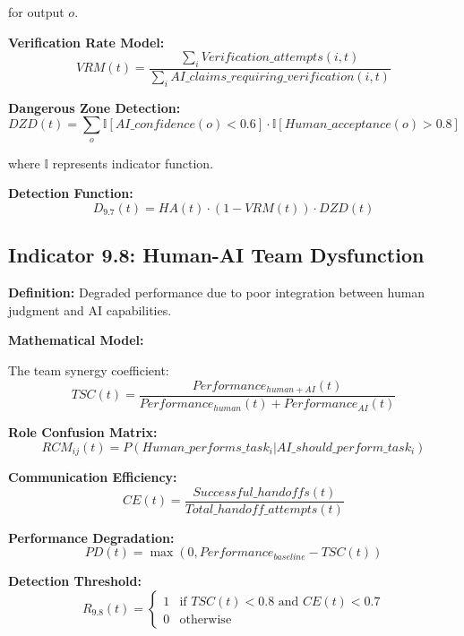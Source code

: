 \documentclass[11pt,a4paper]{article}
\begin{document}
for output $o$.

\textbf{Verification Rate Model:}
\begin{equation}
VRM(t) = \frac{\sum_{i} Verification\_attempts(i,t)}{\sum_{i} AI\_claims\_requiring\_verification(i,t)}
\end{equation}

\textbf{Dangerous Zone Detection:}
\begin{equation}
DZD(t) = \sum_{o} \mathbb{I}[AI\_confidence(o) < 0.6] \cdot \mathbb{I}[Human\_acceptance(o) > 0.8]
\end{equation}

where $\mathbb{I}$ represents indicator function.

\textbf{Detection Function:}
\begin{equation}
D_{9.7}(t) = HA(t) \cdot (1 - VRM(t)) \cdot DZD(t)
\end{equation}

\subsection{Indicator 9.8: Human-AI Team Dysfunction}

\textbf{Definition:} Degraded performance due to poor integration between human judgment and AI capabilities.

\textbf{Mathematical Model:}

The team synergy coefficient:
\begin{equation}
TSC(t) = \frac{Performance_{human+AI}(t)}{Performance_{human}(t) + Performance_{AI}(t)}
\end{equation}

\textbf{Role Confusion Matrix:}
\begin{equation}
RCM_{ij}(t) = P(Human\_performs\_task_i | AI\_should\_perform\_task_i)
\end{equation}

\textbf{Communication Efficiency:}
\begin{equation}
CE(t) = \frac{Successful\_handoffs(t)}{Total\_handoff\_attempts(t)}
\end{equation}

\textbf{Performance Degradation:}
\begin{equation}
PD(t) = \max(0, Performance_{baseline} - TSC(t))
\end{equation}

\textbf{Detection Threshold:}
\begin{equation}
R_{9.8}(t) = \begin{cases}
1 & \text{if } TSC(t) < 0.8 \text{ and } CE(t) < 0.7 \\
0 & \text{otherwise}
\end{cases}
\end{equation}
\end{document}
